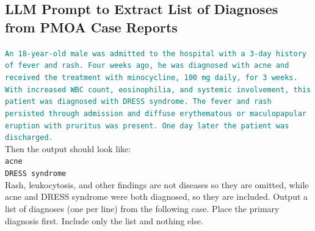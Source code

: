 \subsection{LLM Prompt to Extract List of Diagnoses from PMOA Case Reports}
\label{apd:diagnosis-prompt}
\begin{tcolorbox}[
  colback=gray!5,
  colframe=gray!100,
  title=LLM prompt to extract list of diagnoses from PMOA case reports,
  boxrule=2pt,
  enhanced,
  breakable,                %
  before skip=8pt,          %
  after skip=8pt,           %
  pad at break*=2mm,        %
  fontupper=\scriptsize,
  title after break={Prompt} %
]
\textcolor{teal}{\texttt{An 18-year-old male was admitted to the hospital with a 3-day history of fever and rash. Four weeks ago, he was diagnosed with acne and received the treatment with minocycline, 100 mg daily, for 3 weeks. With increased WBC count, eosinophilia, and systemic involvement, this patient was diagnosed with DRESS syndrome. The fever and rash persisted through admission and diffuse erythematous or maculopapular eruption with pruritus was present. One day later the patient was discharged.}} \\

Then the output should look like:\\
    \texttt{acne} \\
    \texttt{DRESS syndrome} \\

Rash, leukocytosis, and other findings are not diseases so they are omitted, while acne and DRESS syndrome were both diagnosed, so they are included. Output a list of diagnoses (one per line) from the following case. Place the primary diagnosis first. Include only the list and nothing else.

\end{tcolorbox}
